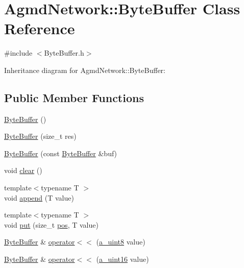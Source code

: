 \hypertarget{class_agmd_network_1_1_byte_buffer}{\section{Agmd\+Network\+:\+:Byte\+Buffer Class Reference}
\label{class_agmd_network_1_1_byte_buffer}
}


{\ttfamily \#include $<$Byte\+Buffer.\+h$>$}



Inheritance diagram for Agmd\+Network\+:\+:Byte\+Buffer\+:
\subsection*{Public Member Functions}
\begin{DoxyCompactItemize}
\item 
\hyperlink{class_agmd_network_1_1_byte_buffer_a4f9412492030e4add7e579adbe19641a}{Byte\+Buffer} ()
\item 
\hyperlink{class_agmd_network_1_1_byte_buffer_af59d49bb8689315350a15323707022e1}{Byte\+Buffer} (size\+\_\+t res)
\item 
\hyperlink{class_agmd_network_1_1_byte_buffer_a13b082150229f1258bc250f1fc7b191e}{Byte\+Buffer} (const \hyperlink{class_agmd_network_1_1_byte_buffer}{Byte\+Buffer} \&buf)
\item 
void \hyperlink{class_agmd_network_1_1_byte_buffer_a0f863fe52dc49cc9b2d46650cffbfc34}{clear} ()
\item 
{\footnotesize template$<$typename T $>$ }\\void \hyperlink{class_agmd_network_1_1_byte_buffer_ad1f64e19c6c0b4039c7b356393cec1dc}{append} (T value)
\item 
{\footnotesize template$<$typename T $>$ }\\void \hyperlink{class_agmd_network_1_1_byte_buffer_a0f3a65bb64d898373d4f0def1ccdddce}{put} (size\+\_\+t \hyperlink{_examples_2_planet_2_app_8cpp_aa8a1c0491559faca4ebd0881575ae7f0}{pos}, T value)
\item 
\hyperlink{class_agmd_network_1_1_byte_buffer}{Byte\+Buffer} \& \hyperlink{class_agmd_network_1_1_byte_buffer_add1f6ffac7a90a65d03fc152868df89b}{operator$<$$<$} (\hyperlink{_common_defines_8h_afbe6c09973474a1f78f870f39073398f}{a\+\_\+uint8} value)
\item 
\hyperlink{class_agmd_network_1_1_byte_buffer}{Byte\+Buffer} \& \hyperlink{class_agmd_network_1_1_byte_buffer_a0110ac6a30e9f563b88c3e28ee65307f}{operator$<$$<$} (\hyperlink{_common_defines_8h_a7e7afab9b2de210021aed9953c6b367f}{a\+\_\+uint16} value)

\end{DoxyCompactItemize}
